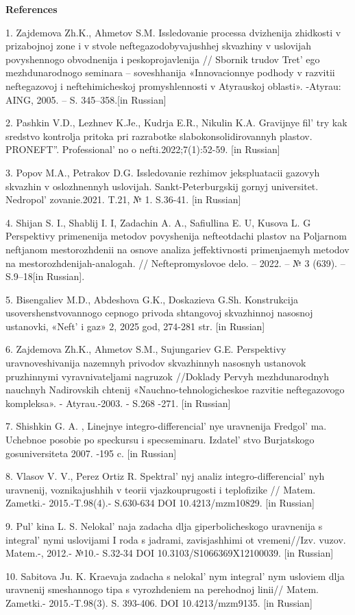 \begin{center}
{\bfseries References}
\end{center}

\begin{references}
1. Zajdemova Zh.K., Ahmetov S.M. Issledovanie processa dvizhenija
zhidkosti v prizabojnoj zone i v stvole neftegazodobyvajushhej skvazhiny
v uslovijah povyshennogo obvodnenija i peskoprojavlenija // Sbornik
trudov Tret' ego mezhdunarodnogo seminara -- soveshhanija
«Innovacionnye podhody v razvitii neftegazovoj i neftehimicheskoj
promyshlennosti v Atyrauskoj oblasti». -Atyrau: AING, 2005. -- S.
345--358.{[}in Russian{]}

2. Pashkin V.D., Lezhnev K.Je., Kudrja E.R., Nikulin K.A. Gravijnye
fil' try kak sredstvo kontrolja pritoka pri razrabotke
slabokonsolidirovannyh plastov. PRONEFT''.
Professional' no o nefti.2022;7(1):52-59. {[}in
Russian{]}

3. Popov M.A., Petrakov D.G. Issledovanie rezhimov jekspluatacii gazovyh
skvazhin v oslozhnennyh uslovijah. Sankt-Peterburgskij gornyj
universitet. Nedropol' zovanie.2021. T.21, № 1.
S.36-41. {[}in Russian{]}

4. Shijan S. I., Shablij I. I, Zadachin A. A., Safiullina E. U, Kusova
L. G Perspektivy primenenija metodov povyshenija nefteotdachi plastov na
Poljarnom neftjanom mestorozhdenii na osnove analiza jeffektivnosti
primenjaemyh metodov na mestorozhdenijah-analogah. // Neftepromyslovoe
delo. -- 2022. -- № 3 (639). -- S.9--18{[}in Russian{]}.

5. Bisengaliev M.D., Abdeshova G.K., Doskazieva G.Sh. Konstrukcija
usovershenstvovannogo cepnogo privoda shtangovoj skvazhinnoj nasosnoj
ustanovki, «Neft'{} i gaz» 2, 2025 god, 274-281 str.
{[}in Russian{]}

6. Zajdemova Zh.K., Ahmetov S.M., Sujungariev G.E. Perspektivy
uravnoveshivanija nazemnyh privodov skvazhinnyh nasosnyh ustanovok
pruzhinnymi vyravnivateljami nagruzok //Doklady Pervyh mezhdunarodnyh
nauchnyh Nadirovskih chtenij «Nauchno-tehnologicheskoe razvitie
neftegazovogo kompleksa». - Atyrau.-2003. - S.268 -271. {[}in
Russian{]}

7. Shishkin G. A. , Linejnye integro-differencial' nye
uravnenija Fredgol' ma. Uchebnoe posobie po speckursu i
specseminaru. Izdatel' stvo Burjatskogo gosuniversiteta
2007. -195 c. {[}in Russian{]}

8. Vlasov V. V., Perez Ortiz R. Spektral' nyj analiz
integro-differencial' nyh uravnenij, voznikajushhih v
teorii vjazkouprugosti i teplofizike // Matem. Zametki.- 2015.-T.98(4).-
S.630-634 DOI 10.4213/mzm10829. {[}in Russian{]}

9. Pul' kina L. S. Nelokal' naja zadacha
dlja giperbolicheskogo uravnenija s integral' nymi
uslovijami I roda s jadrami, zavisjashhimi ot vremeni//Izv. vuzov.
Matem.-, 2012.- №10.- S.32-34 DOI 10.3103/S1066369X12100039. {[}in
Russian{]}

10. Sabitova Ju. K. Kraevaja zadacha s nelokal' nym
integral' nym usloviem dlja uravnenij smeshannogo tipa s
vyrozhdeniem na perehodnoj linii// Matem. Zametki.- 2015.-T.98(3). S.
393-406. DOI 10.4213/mzm9135. {[}in Russian{]}
\end{references}

